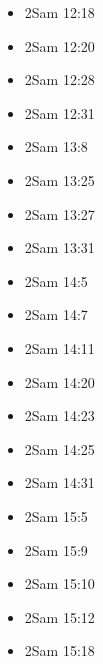 \documentclass[14pt]{article}
\begin{document}
\begin{multicols}{2}
\begin{itemize}
							\item 2Sam 12:18
							
							\item 2Sam 12:20
							
							\item 2Sam 12:28
							
							\item 2Sam 12:31
							
							\item 2Sam 13:8
							
							\item 2Sam 13:25
							
							\item 2Sam 13:27
							
							\item 2Sam 13:31
							
							\item 2Sam 14:5
							
							\item 2Sam 14:7
							
							\item 2Sam 14:11
							
							\item 2Sam 14:20
							
							\item 2Sam 14:23
							
							\item 2Sam 14:25
							
							\item 2Sam 14:31
							
							\item 2Sam 15:5
							
							\item 2Sam 15:9
							
							\item 2Sam 15:10
							
							\item 2Sam 15:12
							
							\item 2Sam 15:18
							

\end{itemize}
\end{multicols}
\end{document}
